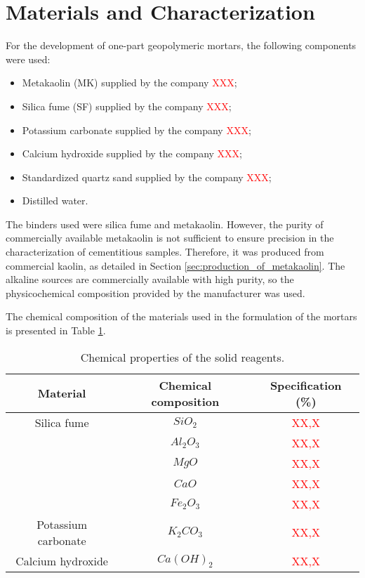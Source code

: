 \section{Materials and Characterization}
\label{sec:materials_and_characterization}

For the development of one-part geopolymeric mortars, the following components were used:

\begin{itemize}
    \item Metakaolin (MK) supplied by the company \textcolor{red}{XXX};
    \item Silica fume (SF) supplied by the company \textcolor{red}{XXX};
    \item Potassium carbonate supplied by the company \textcolor{red}{XXX};
    \item Calcium hydroxide supplied by the company \textcolor{red}{XXX};
    \item Standardized quartz sand supplied by the company \textcolor{red}{XXX};
    \item Distilled water.
\end{itemize}

The binders used were silica fume and metakaolin. However, the purity of commercially available metakaolin is not sufficient to ensure precision in the characterization of cementitious samples.
Therefore, it was produced from commercial kaolin, as detailed in Section \ref{sec:production_of_metakaolin}.
The alkaline sources are commercially available with high purity, so the physicochemical composition provided by the manufacturer was used.

The chemical composition of the materials used in the formulation of the mortars is presented in Table \ref{tab:chemical_composition_reagents}.

\begin{table}[H]
    \caption{Chemical properties of the solid reagents.}
    \label{tab:chemical_composition_reagents}
    \center
    \begin{tabular}{ccc}
        \hline
        Material & Chemical composition & Specification (\%)\\
        \hline
        Silica fume & $SiO_2$ &  \textcolor{red}{XX,X} \\
            & $ Al_2O_3$ & \textcolor{red}{XX,X} \\
            & $MgO$ & \textcolor{red}{XX,X} \\
            & $CaO$ & \textcolor{red}{XX,X} \\
            & $Fe_2O_3$ & \textcolor{red}{XX,X} \\
        Potassium carbonate & $K_2CO_3$ & \textcolor{red}{XX,X} \\
        Calcium hydroxide & $Ca(OH)_2$ & \textcolor{red}{XX,X} \\
        \hline
    \end{tabular}
\end{table}

